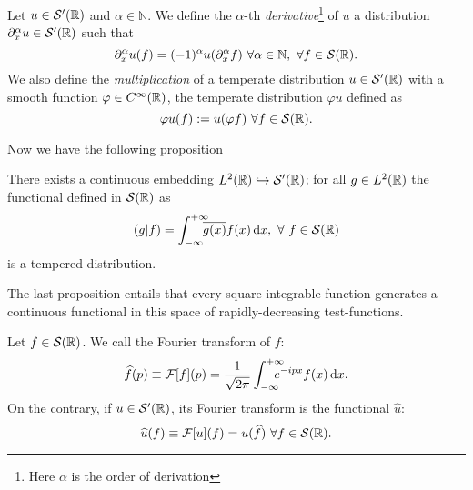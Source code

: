   	\begin{definition}
  	 Let $u\in\mathcal{S}'({\mathbb R})$ and $\alpha\in\mathbb{N}$. We define the $\alpha$-th \textit{derivative}\footnote{Here $\alpha$ is the order of derivation} of $u$ a distribution $\partial_x^\alpha u\in\mathcal{S}'({\mathbb R})$ such that
  	\begin{equation}
  		\partial_x^\alpha u(f)=(-1)^\alpha u(\partial_x^\alpha f)\ \forall\alpha\in\mathbb{N},\ \forall f\in\mathcal{S}({\mathbb R}).
  	\end{equation}
  	We also define the \textit{multiplication} of a temperate distribution $u\in\mathcal{S}'({\mathbb R})$ with a smooth function $\varphi\in C^\infty({\mathbb R})$, the temperate distribution $\varphi u$ defined as
  	\begin{equation}
  		\varphi u(f):=u(\varphi f)\ \forall f\in\mathcal{S}(\mR).
  	\end{equation}
  	\label{def:temp_distribution}
  \end{definition}
  Now we have the following proposition
  \begin{prop}
  	There exists a continuous embedding $L^2({\mathbb R})\hookrightarrow\mathcal{S}'({\mathbb R})$; for all $g\in L^2({\mathbb R})$ the functional defined in $\mathcal{S}({\mathbb R})$ as
  	\begin{equation}
  		(g|f)=\int_{-\infty}^{+\infty}\!\!\!\! \overline{g(x)}f(x)\, \mathrm d x,\ \forall\ f\in\mathcal{S}({\mathbb R})
  	\end{equation}
  	is a tempered distribution.
  \end{prop}
  \begin{oss}
  	The last proposition entails that every square-integrable function generates a continuous functional in this space of rapidly-decreasing test-functions.
  \end{oss}
  
 \begin{definition}
 	Let $f\in \mathcal{S}({\mathbb R})$. We call the Fourier transform of $f$:
 	\begin{equation}
 		\widehat{f}(p)\equiv\mathcal{F}[f](p)=\frac{1}{\sqrt{2\pi}}\int_{-\infty}^{+\infty}\!\!\!\!\!\! e^{-ipx}f(x)\, \mathrm d x.
 		\label{eq:fourier_transform}
 	\end{equation}
 	On the contrary, if $u\in\mathcal{S}'({\mathbb R})$, its Fourier transform is the functional $\hat{u}$:
 	\begin{equation}
 		\hat{u}(f)\equiv\mathcal{F}[u](f)=u(\hat{f})\ \forall f\in\mathcal{S}(\mR).
 	\end{equation}
 	\label{def:fourier_transform}
 \end{definition}
 
